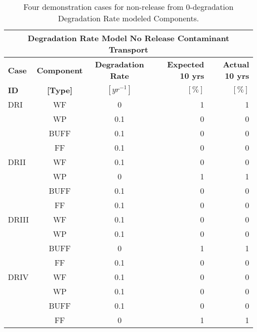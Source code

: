 \begin{table}
\centering
\begin{tabular}{|l|c|c|r|r|}
  \multicolumn{5}{c}{\textbf{Degradation Rate Model No Release Contaminant Transport}}\\
  \hline
  \textbf{Case}  &  \textbf{Component} &  \textbf{Degradation Rate} & \textbf{Expected 10 yrs} & \textbf{Actual 10 yrs}\\
  \textbf{ID}    & \textbf{[Type]} &  \textbf{$[yr^{-1}]$}  &  $[\%]$  & $[\%]$\\
  \hline
  DRI     &  WF    &  0   & 1 & 1\\
          &  WP    &  0.1 & 0 & 0 \\
          &  BUFF  &  0.1 & 0 & 0 \\
          &  FF    &  0.1 & 0 & 0\\
  \hline
  DRII    &  WF    &  0.1 & 0 & 0\\
          &  WP    &  0   & 1 & 1\\
          &  BUFF  &  0.1 & 0 & 0\\
          &  FF    &  0.1 & 0 & 0\\
  \hline
  DRIII   &  WF    &  0.1 & 0 & 0\\
          &  WP    &  0.1 & 0 & 0\\
          &  BUFF  &  0   & 1 & 1\\
          &  FF    &  0.1 & 0 & 0\\
  \hline
  DRIV    &  WF    &  0.1 & 0 & 0\\
          &  WP    &  0.1 & 0 & 0\\
          &  BUFF  &  0.1 & 0 & 0\\
          &  FF    &  0   & 1 & 1\\
  \hline
\end{tabular}
\caption{Four demonstration cases for non-release from 0-degradation Degradation Rate modeled Components.}
\label{tab:dr_no_release}
\end{table}
